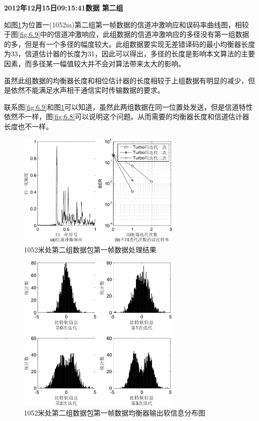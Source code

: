 \textbf{\sihao 2012年12月15日09:15:41数据 第二组} 

如图\ref{fig:6.10}为位置一(1052m)第二组第一帧数据的信道冲激响应和误码率曲线图，相较于图\ref{fig:6.9}中的信道冲激响应，此组数据的信道冲激响应的多径没有第一组数据的多，但是有一个多径的幅度较大。此组数据要实现无差错译码的最小均衡器长度为33，信道估计器的长度为31，因此可以得出，多径的长度是影响本文算法的主要因素，而多径某一幅值较大并不会对算法带来太大的影响。

虽然此组数据的均衡器长度和相位估计器的长度相较于上组数据有明显的减少，但是依然不能满足水声相干通信实时传输数据的要求。

联系图\ref{fig:6.9}和图\ref{fig:6.10}可以知道，虽然此两组数据在同一位置处发送，但是信道特性依然不一样，图\ref{fig:6.8}可以说明这个问题。从而需要的均衡器长度和信道估计器长度也不一样。

\begin{figure}[htb]
  \begin{center}
    \includegraphics[width=0.7\textwidth]{images/result_1_2_s.pdf}
  \end{center}
  \caption{1052米处第二组数据包第一帧数据处理结果}
  \label{fig:6.10}
\end{figure}

\begin{figure}[htb]
  \begin{center}
    \includegraphics[width=0.7\textwidth]{images/softInfo_1_2.pdf}
  \end{center}
  \caption{1052米处第二组数据包第一帧数据均衡器输出软信息分布图}
  \label{fig:6.10s}
\end{figure}

